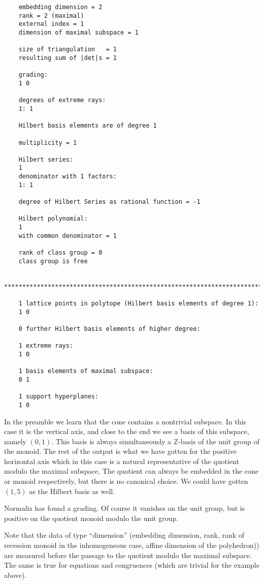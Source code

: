 \documentclass[12pt,a4paper]{scrartcl}
\theoremstyle{definition}
\def\ZZ{{\mathbb Z}}
\begin{document}
{\begin{Verbatim}
	embedding dimension = 2
	rank = 2 (maximal)
	external index = 1
	dimension of maximal subspace = 1
	
	size of triangulation   = 1
	resulting sum of |det|s = 1
	
	grading:
	1 0 
	
	degrees of extreme rays:
	1: 1  
	
	Hilbert basis elements are of degree 1
	
	multiplicity = 1
	
	Hilbert series:
	1 
	denominator with 1 factors:
	1: 1  
	
	degree of Hilbert Series as rational function = -1
	
	Hilbert polynomial:
	1 
	with common denominator = 1
	
	rank of class group = 0
	class group is free
	
	***********************************************************************
	
	1 lattice points in polytope (Hilbert basis elements of degree 1):
	1 0
	
	0 further Hilbert basis elements of higher degree:
	
	1 extreme rays:
	1 0
	
	1 basis elements of maximal subspace:
	0 1
	
	1 support hyperplanes:
	1 0
	\end{Verbatim}
	
	In the preamble we learn that the cone contains a nontrivial subspace. In this case it is the vertical axis, and close to the end we see a basis of this subspace, namely $(0,1)$. This basis is always simultaneously a $\ZZ$-basis of the unit group of the monoid. The rest of the output is what we have gotten for the positive horizontal axis which in this case is a natural representative of the quotient modulo the maximal subspace, The quotient can always be embedded in the cone or monoid respectively, but there is no canonical choice. We could have gotten $(1,5)$ as the Hilbert basis as well.
	
	Normaliz has found a grading. Of course it vanishes on the unit group, but is positive on the quotient monoid modulo the unit group.
	
	Note that the data of type ``dimension'' (embedding dimension, rank, rank of recession monoid in the inhomogeneous case, affine dimension of the polyhedron)) are measured before the passage to the quotient modulo the maximal subspace. The same is true for equations and congruences (which are trivial for the example above).
	
}
\end{document}
